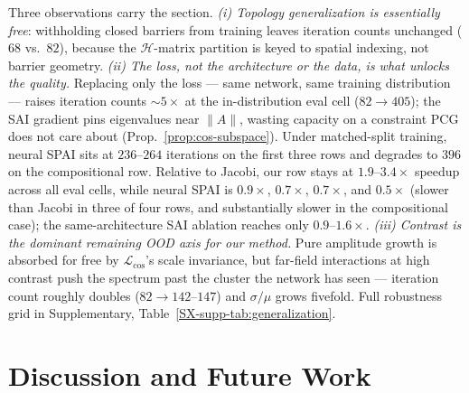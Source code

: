 \documentclass[acmtog,anonymous,review]{acmart}
\theoremstyle{plain}
\begin{document}
Three observations carry the section. \emph{(i) Topology generalization is
essentially free}: withholding closed barriers from training leaves iteration
counts unchanged ($68$ vs.\ $82$), because the $\mathcal{H}$-matrix partition is
keyed to spatial indexing, not barrier geometry. \emph{(ii) The loss, not the
architecture or the data, is what unlocks the quality.} Replacing only the loss
--- same network, same training distribution --- raises iteration counts
$\sim\!5\times$ at the in-distribution eval cell ($82\!\to\!405$); the SAI
gradient pins eigenvalues near $\|A\|$, wasting capacity on a constraint PCG
does not care about (Prop.~\ref{prop:cos-subspace}). Under matched-split training,
neural SPAI sits at $236$--$264$ iterations on the first three rows and degrades to
$396$ on the compositional row. Relative to Jacobi, our row stays at
$1.9$--$3.4\times$ speedup across all eval cells, while neural SPAI is
$0.9\times$, $0.7\times$, $0.7\times$, and $0.5\times$ (slower than Jacobi in
three of four rows, and substantially slower in the compositional case); the
same-architecture SAI ablation reaches only $0.9$--$1.6\times$. \emph{(iii) Contrast is the dominant
remaining OOD axis for our method.} Pure amplitude growth is absorbed for free
by $\mathcal{L}_{\cos}$'s scale invariance, but far-field interactions at high
contrast push the spectrum past the cluster the network has seen --- iteration
count roughly doubles ($82\!\to\!142$--$147$) and $\sigma/\mu$ grows fivefold.
Full robustness grid in Supplementary, Table~\ref{SX-supp-tab:generalization}.

\section{Discussion and Future Work}
\label{sec:limitations}
\end{document}
